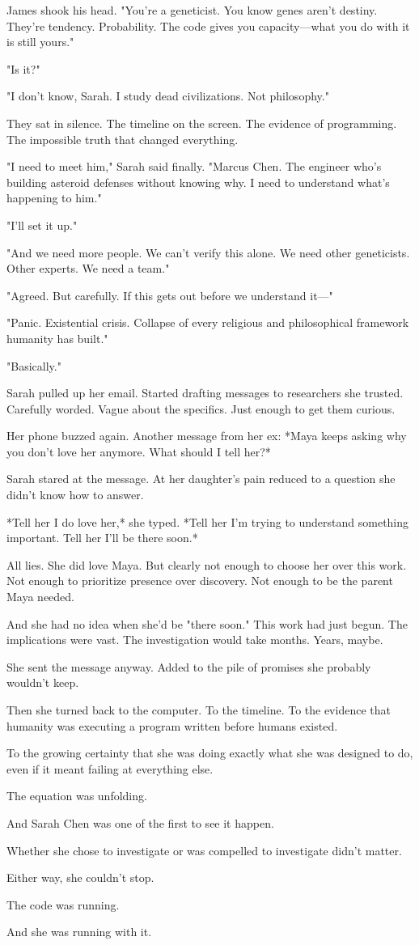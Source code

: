 James shook his head. "You're a geneticist. You know genes aren't destiny. They're tendency. Probability. The code gives you capacity—what you do with it is still yours."

"Is it?"

"I don't know, Sarah. I study dead civilizations. Not philosophy."

They sat in silence. The timeline on the screen. The evidence of programming. The impossible truth that changed everything.

"I need to meet him," Sarah said finally. "Marcus Chen. The engineer who's building asteroid defenses without knowing why. I need to understand what's happening to him."

"I'll set it up."

"And we need more people. We can't verify this alone. We need other geneticists. Other experts. We need a team."

"Agreed. But carefully. If this gets out before we understand it—"

"Panic. Existential crisis. Collapse of every religious and philosophical framework humanity has built."

"Basically."

Sarah pulled up her email. Started drafting messages to researchers she trusted. Carefully worded. Vague about the specifics. Just enough to get them curious.

Her phone buzzed again. Another message from her ex: *Maya keeps asking why you don't love her anymore. What should I tell her?*

Sarah stared at the message. At her daughter's pain reduced to a question she didn't know how to answer.

*Tell her I do love her,* she typed. *Tell her I'm trying to understand something important. Tell her I'll be there soon.*

All lies. She did love Maya. But clearly not enough to choose her over this work. Not enough to prioritize presence over discovery. Not enough to be the parent Maya needed.

And she had no idea when she'd be "there soon." This work had just begun. The implications were vast. The investigation would take months. Years, maybe.

She sent the message anyway. Added to the pile of promises she probably wouldn't keep.

Then she turned back to the computer. To the timeline. To the evidence that humanity was executing a program written before humans existed.

To the growing certainty that she was doing exactly what she was designed to do, even if it meant failing at everything else.

The equation was unfolding.

And Sarah Chen was one of the first to see it happen.

Whether she chose to investigate or was compelled to investigate didn't matter.

Either way, she couldn't stop.

The code was running.

And she was running with it.

